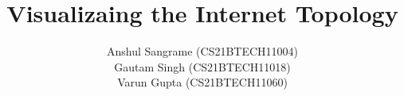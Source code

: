 \documentclass[journal,12pt,twocolumn]{IEEEtran}
\DeclareMathOperator*{\Res}{Res}
\begin{document}
\newtheorem{theorem}{Theorem}[section]
\newtheorem{problem}{Problem}
\newtheorem{proposition}{Proposition}[section]
\newtheorem{lemma}{Lemma}[section]
\newtheorem{corollary}[theorem]{Corollary}
\newtheorem{example}{Example}[section]
\newtheorem{definition}[problem]{Definition}
\newcommand{\BEQA}{\begin{eqnarray}}
\newcommand{\EEQA}{\end{eqnarray}}
\newcommand{\define}{\stackrel{\triangle}{=}}

\providecommand{\mbf}{\mathbf}
\providecommand{\pr}[1]{\ensuremath{\Pr\left(#1\right)}}
\providecommand{\qfunc}[1]{\ensuremath{Q\left(#1\right)}}
\providecommand{\sbrak}[1]{\ensuremath{{}\left[#1\right]}}
\providecommand{\lsbrak}[1]{\ensuremath{{}\left[#1\right.}}
\providecommand{\rsbrak}[1]{\ensuremath{{}\left.#1\right]}}
\providecommand{\brak}[1]{\ensuremath{\left(#1\right)}}
\providecommand{\lbrak}[1]{\ensuremath{\left(#1\right.}}
\providecommand{\rbrak}[1]{\ensuremath{\left.#1\right)}}
\providecommand{\cbrak}[1]{\ensuremath{\left\{#1\right\}}}
\providecommand{\lcbrak}[1]{\ensuremath{\left\{#1\right.}}
\providecommand{\rcbrak}[1]{\ensuremath{\left.#1\right\}}}
\theoremstyle{remark}
\newtheorem{rem}{Remark}
\newcommand{\sgn}{\mathop{\mathrm{sgn}}}
\providecommand{\abs}[1]{\left\vert#1\right\vert}
\providecommand{\res}[1]{\Res\displaylimits_{#1}} 
\providecommand{\norm}[1]{\left\lVert#1\right\rVert}
\providecommand{\mtx}[1]{\mathbf{#1}}
\providecommand{\mean}[1]{E\left[ #1 \right]}   
\providecommand{\fourier}{\overset{\mathcal{F}}{ \rightleftharpoons}}
\providecommand{\system}[1]{\overset{\mathcal{#1}}{ \longleftrightarrow}}
\newcommand{\solution}{\noindent \textbf{Solution: }}
\newcommand{\cosec}{\,\text{cosec}\,}
\providecommand{\dec}[2]{\ensuremath{\overset{#1}{\underset{#2}{\gtrless}}}}
\newcommand{\myvec}[1]{\ensuremath{\begin{pmatrix}#1\end{pmatrix}}}
\newcommand{\mydet}[1]{\ensuremath{\begin{vmatrix}#1\end{vmatrix}}}
\renewcommand{\vec}[1]{\boldsymbol{\mathbf{#1}}}
\def\putbox#1#2#3{\makebox[0in][l]{\makebox[#1][l]{}\raisebox{\baselineskip}[0in][0in]{\raisebox{#2}[0in][0in]{#3}}}}
     \def\rightbox#1{\makebox[0in][r]{#1}}
     \def\centbox#1{\makebox[0in]{#1}}
     \def\topbox#1{\raisebox{-\baselineskip}[0in][0in]{#1}}
     \def\midbox#1{\raisebox{-0.5\baselineskip}[0in][0in]{#1}}

\vspace{3cm}
\title{Visualizaing the Internet Topology}
\author{Anshul Sangrame (CS21BTECH11004)\\Gautam Singh (CS21BTECH11018)\\Varun Gupta (CS21BTECH11060)}
\maketitle
\tableofcontents
\bigskip
\end{document}

